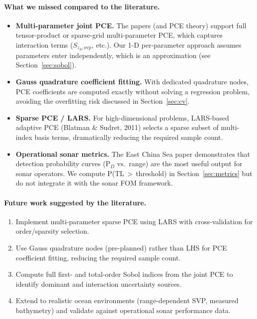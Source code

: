 \documentclass[11pt,a4paper]{article}
\begin{document}
\paragraph{What we missed compared to the literature.}
\begin{itemize}
  \item \textbf{Multi-parameter joint PCE.} The papers (and PCE theory) support
        full tensor-product or sparse-grid multi-parameter PCE, which captures
        interaction terms ($S_{z_S,\mathrm{svp}}$, etc.).  Our 1-D per-parameter
        approach assumes parameters enter independently, which is an approximation
        (see Section~\ref{sec:sobol}).
  \item \textbf{Gauss quadrature coefficient fitting.} With dedicated quadrature
        nodes, PCE coefficients are computed exactly without solving a regression
        problem, avoiding the overfitting risk discussed in Section~\ref{sec:cv}.
  \item \textbf{Sparse PCE / LARS.}  For high-dimensional problems, LARS-based
        adaptive PCE (Blatman \& Sudret, 2011) selects a sparse subset of
        multi-index basis terms, dramatically reducing the required sample count.
  \item \textbf{Operational sonar metrics.}  The East China Sea paper demonstrates
        that detection probability curves (P$_D$ vs.\ range) are the most useful
        output for sonar operators.  We compute P(TL\,$>$\,threshold) in
        Section~\ref{sec:metrics} but do not integrate it with the sonar FOM framework.
\end{itemize}

\paragraph{Future work suggested by the literature.}
\begin{enumerate}
  \item Implement multi-parameter sparse PCE using LARS with cross-validation for
        order/sparsity selection.
  \item Use Gauss quadrature nodes (pre-planned) rather than LHS for PCE coefficient
        fitting, reducing the required sample count.
  \item Compute full first- and total-order Sobol indices from the joint PCE to
        identify dominant and interaction uncertainty sources.
  \item Extend to realistic ocean environments (range-dependent SVP, measured
        bathymetry) and validate against operational sonar performance data.
\end{enumerate}
\end{document}
